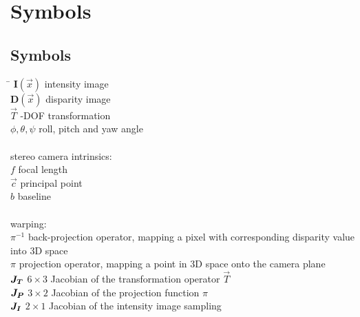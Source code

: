 \chapter*{Symbols}
\label{sec:symbols}

\section*{Symbols}

\begin{tabbing}
 \hspace*{1.6cm} \= \kill
 $\mathbf{I}(\vec{x})$          \> intensity image \\[0.5ex]
 $\mathbf{D}(\vec{x})$          \> disparity image \\[0.5ex]
 $\vec{T}$                      -DOF transformation \\[0.5ex]
 $\phi, \theta, \psi$           \> roll, pitch and yaw angle \\[0.5ex]
 \\
 stereo camera intrinsics: \\
 $f$                            \> focal length \\[0.5ex]
 $\vec{c}$                      \> principal point \\[0.5ex]
 $b$                            \> baseline \\[0.5ex]
 \\
 warping: \\
 $\pi^{-1}$                     \> back-projection operator, mapping a pixel with corresponding disparity value into 3D space \\[0.5ex]
 $\pi$                          \> projection operator, mapping a point in 3D space onto the camera plane \\[0.5ex]
 $\mat{J_T}$                    \> $6 \times 3$ Jacobian of the transformation operator $\vec{T}$ \\[0.5ex]
 $\mat{J_P}$                    \> $3 \times 2$ Jacobian of the projection function $\pi$ \\[0.5ex]
 $\mat{J_I}$                    \> $2 \times 1$ Jacobian of the intensity image sampling \\[0.5ex]
\end{tabbing}

